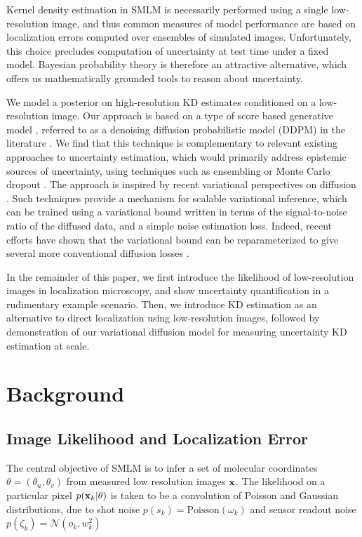 \documentclass{article}
\begin{document}
Kernel density estimation in SMLM is necessarily performed using a single low-resolution image, and thus common measures of model performance are based on localization errors computed over ensembles of simulated images. Unfortunately, this choice precludes computation of uncertainty at test time under a fixed model. Bayesian probability theory is therefore an attractive alternative, which offers us mathematically grounded tools to reason about uncertainty. 

We model a posterior on high-resolution KD estimates conditioned on a low-resolution image. Our approach is based on a type of score based generative model \citep{Song2021}, referred to as a denoising diffusion probabilistic model (DDPM) in the literature \citep{Ho2020,Song2021}. We find that this technique is complementary to relevant existing approaches to uncertainty estimation, which would primarily address epistemic sources of uncertainty, using techniques such as ensembling \citep{Lakshminarayanan2017} or Monte Carlo dropout \citep{Gal2022}. The approach is inspired by recent variational perspectives on diffusion \citep{Dirmeier2023,Ribeiro2024,Kingma2021,Kingma2023}.  Such techniques provide a mechanism for scalable variational inference, which can be trained using a variational bound written in terms of the signal-to-noise ratio of the diffused data, and a simple noise estimation loss. Indeed, recent efforts have shown that the variational bound can be reparameterized to give several more conventional diffusion losses \citep{Kingma2021,Kingma2023,Ribeiro2024}. 

In the remainder of this paper, we first introduce the likelihood of low-resolution images in localization microscopy, and show uncertainty quantification in a rudimentary example scenario. Then, we introduce KD estimation as an alternative to direct localization using low-resolution images, followed by demonstration of our variational diffusion model for measuring uncertainty KD estimation at scale. 

\section{Background}

\subsection{Image Likelihood and Localization Error}

The central objective of SMLM is to infer a set of molecular coordinates $\theta=(\theta_{u},\theta_{v})$ from measured low resolution images $\bold{x}$. The likelihood on a particular pixel $p(\bold{x}_k|\theta)$ is taken to be a convolution of Poisson and Gaussian distributions, due to shot noise $p(s_{k}) = \mathrm{Poisson}(\omega_{k})$ and sensor readout noise $p(\zeta_{k}) = \mathcal{N}(o_{k},w_{k}^{2})$ 
\end{document}
